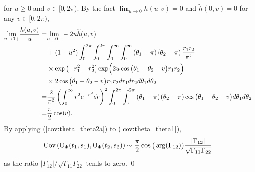 \documentclass{amsart}
\begin{document}
for $u\geq 0$ and $v\in[0,2\pi)$.
By the fact $\lim_{u\rightarrow0}h(u,v)=0$ and $\widetilde{h}(0,v)=0$ for any $v\in[0,2\pi)$,
\begin{align}\notag
\underset{u\rightarrow0+}{\lim} \frac{h(u,v)}{u}
=&
\underset{u\rightarrow0+}{\lim}
-2u\widetilde{h}(u,v)
\\\notag&+(1-u^2)\int_{0}^{2\pi}\int_{0}^{2\pi}\int_{0}^{\infty}\int_{0}^{\infty} \left(\theta_{1}-\pi\right)\left(\theta_{2}-\pi\right)\frac{r_{1}r_{2}}{\pi^{2}}
\\\notag&\times\textup{exp}\left(-r_{1}^{2}-r_{2}^{2}
\right)\textup{exp}\Big(
2u
\cos\big(\theta_{1}-\theta_{2}-v\big)r_{1}r_{2}
\Big)
\\\notag&\times 2
\cos\big(\theta_{1}-\theta_{2}-v\big)r_{1}r_{2}dr_{1}dr_{2}d\theta_{1}d\theta_{2}
\\\notag
=&\frac{2}{\pi^{2}}\left(\int_{0}^{\infty}r^2 e^{-r^{2}}
dr
\right)^2
\int_{0}^{2\pi}\int_{0}^{2\pi}\left(\theta_{1}-\pi\right)\left(\theta_{2}-\pi\right)
\cos\big(\theta_{1}-\theta_{2}-v\big) d\theta_{1}d\theta_{2}
\\\label{cov:theta_theta2a}=&
\frac{\pi}{2}\cos(v).
\end{align}
By applying (\ref{cov:theta_theta2a}) to (\ref{cov:theta_theta1}),
\begin{align}\notag
\textup{Cov}\left(\Theta_{\Phi}(t_{1},s_{1}),\Theta_{\Phi}(t_{2},s_{2})\right)\sim \frac{\pi}{2}\cos\big(\arg(\Gamma_{12})\big) \frac{|\Gamma_{12}|}{\sqrt{\Gamma_{11}\Gamma_{22}}}
\end{align}
as the ratio  $|\Gamma_{12}|/\sqrt{\Gamma_{11}\Gamma_{22}}$ tends to zero.
\qed






\end{document}
